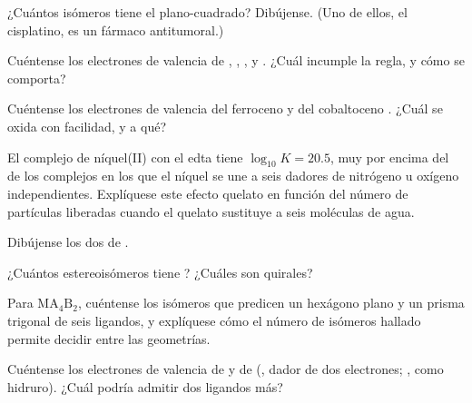\begin{exercise}[$\star\star$]\label{exo:b2:coordination-complexes:5}
¿Cuántos isómeros tiene el \ce{[PtCl2(NH3)2]} plano-cuadrado? Dibújense. (Uno de ellos,
el cisplatino, es un fármaco antitumoral.)
\end{exercise}

\begin{exercise}[$\star\star$]\label{exo:b2:coordination-complexes:6}
Cuéntense los electrones de valencia de , , ,
 y . ¿Cuál incumple la regla, y cómo se comporta?
\end{exercise}

\begin{exercise}[$\star\star$]\label{exo:b2:coordination-complexes:7}
Cuéntense los electrones de valencia del ferroceno y del cobaltoceno . ¿Cuál se
oxida con facilidad, y a qué?
\end{exercise}

\begin{exercise}[$\star\star$]\label{exo:b2:coordination-complexes:8}
El complejo de níquel(II) con el edta tiene $\log_{10}K = 20.5$, muy por encima del de los complejos en
los que el níquel se une a seis dadores de nitrógeno u oxígeno independientes. Explíquese este efecto quelato
en función del número de partículas liberadas cuando el quelato sustituye a seis moléculas
de agua.
\end{exercise}

\begin{exercise}[$\star\star$]\label{exo:b2:coordination-complexes:9}
Dibújense los dos  de .
\end{exercise}

\begin{exercise}[$\star\star\star$]\label{exo:b2:coordination-complexes:10}
¿Cuántos estereoisómeros tiene \ce{[CoCl2(en)2]+}? ¿Cuáles son quirales?
\end{exercise}

\begin{exercise}[$\star\star\star$]\label{exo:b2:coordination-complexes:11}
Para $\mathrm{MA_4B_2}$, cuéntense los isómeros que predicen un hexágono plano y un prisma
trigonal de seis ligandos, y explíquese cómo el número de isómeros hallado permite decidir entre las
geometrías.
\end{exercise}

\begin{exercise}[$\star\star\star$]\label{exo:b2:coordination-complexes:12}
Cuéntense los electrones de valencia de  y de 
(, dador de dos electrones; , como hidruro). ¿Cuál podría admitir dos
ligandos más?
\end{exercise}

